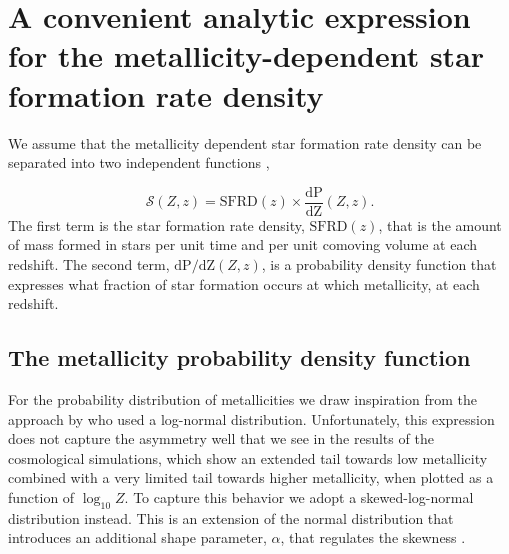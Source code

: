 \documentclass[twocolumn]{aastex631}
\newcommand{\SFRDzZ}{\ensuremath{\mathcal{S}(Z,z)}\xspace}
\newcommand{\SFRDz}{\ensuremath{\mathrm{SFRD}(z)}\xspace}
\newcommand{\dPdZ}{\ensuremath{\mathrm{\frac{dP}{dZ}}(Z,z)}\xspace}
\newcommand{\dpdZ}{\ensuremath{\mathrm{dP/dZ}(Z,z)}\xspace}
\begin{document}


\section{A convenient analytic expression for the metallicity-dependent star formation rate density \label{sec: model for sfrd(zZ)} }
We assume that the metallicity dependent star formation rate density can be separated into two independent functions \citep[e.g.\ ][]{Langer2006},

\begin{equation}
\label{eq: total sfrd}
\boxed{
        \SFRDzZ = \SFRDz \times \dPdZ.
        }
\end{equation}
The first term is the star formation rate density, \SFRDz, that is the amount of mass formed in stars per unit time and per unit comoving volume at each redshift. The second term, \dpdZ, is a probability density function that expresses what fraction of star formation occurs at which metallicity, at each redshift. 
 

\subsection{The metallicity probability density function}
For the probability distribution of metallicities we draw inspiration from the approach by \citep[e.g.\ ][]{Neijssel+2019} who used a log-normal distribution. Unfortunately, this expression does not capture the asymmetry well that we see in the results of the cosmological simulations, which show an extended tail towards low metallicity combined with a very limited tail towards higher metallicity, when plotted as a function of $\log_{10} Z$. To capture this behavior we adopt a skewed-log-normal distribution instead. This is an extension of the normal distribution that introduces an additional shape parameter, $\alpha$, that regulates the skewness \citep[first introduced by][]{Ohagan+1976}. %
\end{document}
